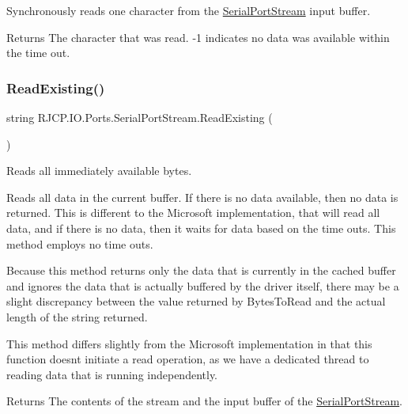 Synchronously reads one character from the \mbox{\hyperlink{class_r_j_c_p_1_1_i_o_1_1_ports_1_1_serial_port_stream}{Serial\+Port\+Stream}} input buffer. 

\begin{DoxyReturn}{Returns}
The character that was read. -\/1 indicates no data was available within the time out.
\end{DoxyReturn}
\mbox{\label{class_r_j_c_p_1_1_i_o_1_1_ports_1_1_serial_port_stream_a0009a74b2a1520a628db0e4ddc3483da}} 
\subsubsection{\texorpdfstring{ReadExisting()}{ReadExisting()}}
{\footnotesize\ttfamily string R\+J\+C\+P.\+I\+O.\+Ports.\+Serial\+Port\+Stream.\+Read\+Existing (\begin{DoxyParamCaption}{ }\end{DoxyParamCaption})}



Reads all immediately available bytes. 

Reads all data in the current buffer. If there is no data available, then no data is returned. This is different to the Microsoft implementation, that will read all data, and if there is no data, then it waits for data based on the time outs. This method employs no time outs. 

Because this method returns only the data that is currently in the cached buffer and ignores the data that is actually buffered by the driver itself, there may be a slight discrepancy between the value returned by Bytes\+To\+Read and the actual length of the string returned.

This method differs slightly from the Microsoft implementation in that this function doesn\textquotesingle{}t initiate a read operation, as we have a dedicated thread to reading data that is running independently.

\begin{DoxyReturn}{Returns}
The contents of the stream and the input buffer of the \mbox{\hyperlink{class_r_j_c_p_1_1_i_o_1_1_ports_1_1_serial_port_stream}{Serial\+Port\+Stream}}.
\end{DoxyReturn}
\mbox{\label{class_r_j_c_p_1_1_i_o_1_1_ports_1_1_serial_port_stream_a836874d988f8a551e7a7f7f807c366d3}} 
